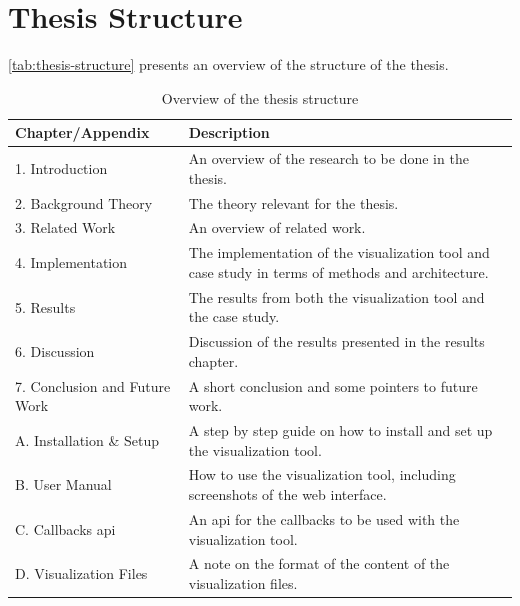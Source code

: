 \section{Thesis Structure}

\autoref{tab:thesis-structure} presents an overview of the structure of the thesis.

\begin{table}[!h]
\begin{center}
\begin{tabular}{ | l | p{7.3cm} |}
\hline
\textbf{Chapter/Appendix} & \textbf{Description} \\ \hline
1. Introduction & An overview of the research to be done in the thesis. \\ \hline
2. Background Theory & The theory relevant for the thesis. \\ \hline
3. Related Work & An overview of related work. \\ \hline
4. Implementation & The implementation of the visualization tool and case study in terms of methods and architecture. \\ \hline
5. Results & The results from both the visualization tool and the case study. \\ \hline
6. Discussion & Discussion of the results presented in the results chapter. \\ \hline
7. Conclusion and Future Work & A short conclusion and some pointers to future work. \\ \hline
A. Installation \& Setup & A step by step guide on how to install and set up the visualization tool. \\ \hline
B. User Manual & How to use the visualization tool, including screenshots of the web interface. \\ \hline
C. Callbacks \acrshort{api} & An \acrshort{api} for the callbacks to be used with the visualization tool. \\ \hline
D. Visualization Files & A note on the format of the content of the visualization files. \\ \hline
\end{tabular}
\end{center}
\caption{Overview of the thesis structure}
\label{tab:thesis-structure}
\end{table}

\cleardoublepage